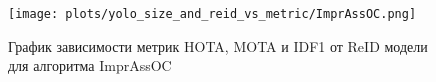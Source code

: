 \begin{figure}[ht]
    \centering
    \texttt{[image: plots/yolo\_size\_and\_reid\_vs\_metric/ImprAssOC.png]}
    \caption{График зависимости метрик HOTA, MOTA и IDF1 от ReID модели для алгоритма ImprAssOC}
    \label{fig:yolo_reid_ImprAssOC}
\end{figure}
\FloatBarrier

